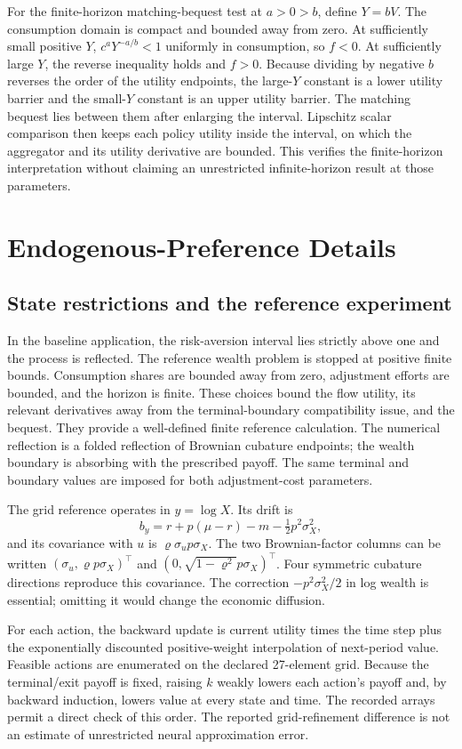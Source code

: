 \documentclass[ecta,draft]{econsocart}
\begin{document}
For the finite-horizon matching-bequest test at $a>0>b$, define $Y=bV$. The consumption domain is compact and bounded away from zero. At sufficiently small positive $Y$, $c^aY^{-a/b}<1$ uniformly in consumption, so $f<0$. At sufficiently large $Y$, the reverse inequality holds and $f>0$. Because dividing by negative $b$ reverses the order of the utility endpoints, the large-$Y$ constant is a lower utility barrier and the small-$Y$ constant is an upper utility barrier. The matching bequest lies between them after enlarging the interval. Lipschitz scalar comparison then keeps each policy utility inside the interval, on which the aggregator and its utility derivative are bounded. This verifies the finite-horizon interpretation without claiming an unrestricted infinite-horizon result at those parameters.

\section{Endogenous-Preference Details}
\subsection{State restrictions and the reference experiment}
In the baseline application, the risk-aversion interval lies strictly above one and the process is reflected. The reference wealth problem is stopped at positive finite bounds. Consumption shares are bounded away from zero, adjustment efforts are bounded, and the horizon is finite. These choices bound the flow utility, its relevant derivatives away from the terminal-boundary compatibility issue, and the bequest. They provide a well-defined finite reference calculation. The numerical reflection is a folded reflection of Brownian cubature endpoints; the wealth boundary is absorbing with the prescribed payoff. The same terminal and boundary values are imposed for both adjustment-cost parameters.

The grid reference operates in $y=\log X$. Its drift is
\[
 b_y=r+p(\mu-r)-m-\tfrac12p^2\sigma_X^2,
\]
and its covariance with $u$ is $\varrho\sigma_u p\sigma_X$. The two Brownian-factor columns can be written $(\sigma_u,\varrho p\sigma_X)^\top$ and $(0,\sqrt{1-\varrho^2}p\sigma_X)^\top$. Four symmetric cubature directions reproduce this covariance. The correction $-p^2\sigma_X^2/2$ in log wealth is essential; omitting it would change the economic diffusion.

For each action, the backward update is current utility times the time step plus the exponentially discounted positive-weight interpolation of next-period value. Feasible actions are enumerated on the declared 27-element grid. Because the terminal/exit payoff is fixed, raising $k$ weakly lowers each action's payoff and, by backward induction, lowers value at every state and time. The recorded arrays permit a direct check of this order. The reported grid-refinement difference is not an estimate of unrestricted neural approximation error.
\end{document}
